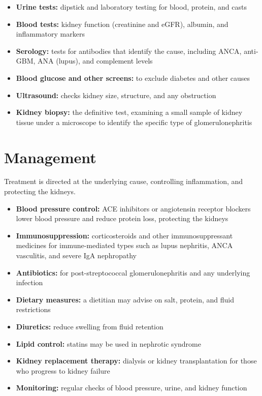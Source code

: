 \begin{itemize}
    \item \textbf{Urine tests:} dipstick and laboratory testing for blood, protein, and casts
    \item \textbf{Blood tests:} kidney function (creatinine and eGFR), albumin, and inflammatory markers
    \item \textbf{Serology:} tests for antibodies that identify the cause, including ANCA, anti-GBM, ANA (lupus), and complement levels
    \item \textbf{Blood glucose and other screens:} to exclude diabetes and other causes
    \item \textbf{Ultrasound:} checks kidney size, structure, and any obstruction
    \item \textbf{Kidney biopsy:} the definitive test, examining a small sample of kidney tissue under a microscope to identify the specific type of glomerulonephritis
\end{itemize}

\section*{Management}
Treatment is directed at the underlying cause, controlling inflammation, and protecting the kidneys.

\begin{itemize}
    \item \textbf{Blood pressure control:} ACE inhibitors or angiotensin receptor blockers lower blood pressure and reduce protein loss, protecting the kidneys
    \item \textbf{Immunosuppression:} corticosteroids and other immunosuppressant medicines for immune-mediated types such as lupus nephritis, ANCA vasculitis, and severe IgA nephropathy
    \item \textbf{Antibiotics:} for post-streptococcal glomerulonephritis and any underlying infection
    \item \textbf{Dietary measures:} a dietitian may advise on salt, protein, and fluid restrictions
    \item \textbf{Diuretics:} reduce swelling from fluid retention
    \item \textbf{Lipid control:} statins may be used in nephrotic syndrome
    \item \textbf{Kidney replacement therapy:} dialysis or kidney transplantation for those who progress to kidney failure
    \item \textbf{Monitoring:} regular checks of blood pressure, urine, and kidney function
\end{itemize}


